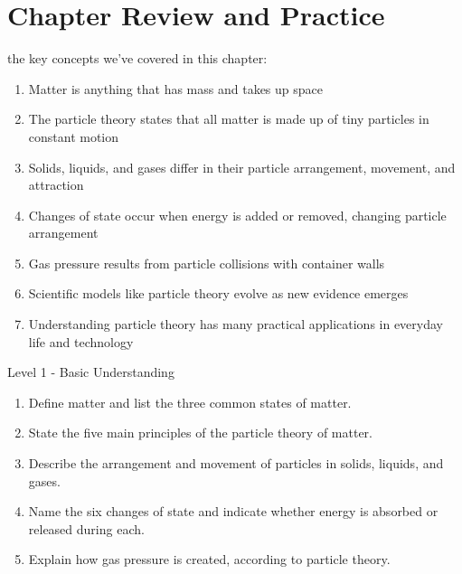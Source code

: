 \section{Chapter Review and Practice}

 the key concepts we've covered in this chapter:

\begin{enumerate}
    \item Matter is anything that has mass and takes up space
    \item The particle theory states that all matter is made up of tiny particles in constant motion
    \item Solids, liquids, and gases differ in their particle arrangement, movement, and attraction
    \item Changes of state occur when energy is added or removed, changing particle arrangement
    \item Gas pressure results from particle collisions with container walls
    \item Scientific models like particle theory evolve as new evidence emerges
    \item Understanding particle theory has many practical applications in everyday life and technology
\end{enumerate}

\begin{tieredquestions}{Level 1 - Basic Understanding}
\begin{enumerate}
    \item Define matter and list the three common states of matter.
    \item State the five main principles of the particle theory of matter.
    \item Describe the arrangement and movement of particles in solids, liquids, and gases.
    \item Name the six changes of state and indicate whether energy is absorbed or released during each.
    \item Explain how gas pressure is created, according to particle theory.
\end{enumerate}
\end{tieredquestions}

